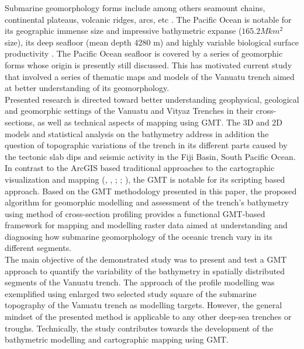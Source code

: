 \documentclass[USenglish]{article}
\begin{document}
Submarine geomorphology forms include among others seamount chains, continental plateaus, volcanic ridges, arcs, etc \citep{Burbank}. The Pacific Ocean is notable for its geographic immense size and impressive bathymetric expanse ($165.2 M km^{2}$ size), its deep seafloor (mean depth 4280 m) and highly variable biological surface productivity \citep{Linleyetal2017}. The Pacific Ocean seafloor is covered by a series of geomorphic forms whose origin is presently still discussed. This has motivated current study that involved a series of thematic maps and  models of the Vanuatu trench aimed at better understanding of its geomorphology.\\
Presented research is directed toward better understanding geophysical, geological and geomorphic settings of the Vanuatu and Vityaz Trenches in their cross-sections, as well as technical aspects of mapping using GMT. The 3D and 2D models and statistical analysis on the bathymetry address in addition the question of topographic variations of the trench in its different parts caused by the tectonic slab dips and seismic activity in the Fiji Basin, South Pacific Ocean.\\
In contrast to the ArcGIS based traditional approaches to the cartographic visualization and mapping (\cite{Suetova2005a}, \cite{Suetova2005b}, \cite{Klauco2013b}; \cite{Klauco2014}; \cite{Klauco2017}), the GMT is notable for its scripting based approach. Based on the GMT methodology presented in this paper, the proposed algorithm for geomorphic modelling and assessment of the trench's bathymetry using method of cross-section profiling provides a functional GMT-based framework for mapping and modelling raster data aimed at understanding and diagnosing how submarine geomorphology of the oceanic trench vary in its different segments. \\
The main objective of the demonstrated study was to present and test a GMT approach to quantify the variability of the bathymetry in spatially distributed segments of the Vanuatu trench. The approach of the profile modelling was exemplified using enlarged two selected study square of the submarine topography of the Vanuatu trench as modelling targets.   However, the general mindset of the presented method is applicable to any other deep-sea  trenches or troughs. Technically, the study contributes towards the development of the bathymetric modelling and cartographic mapping using GMT. \\
\end{document}
